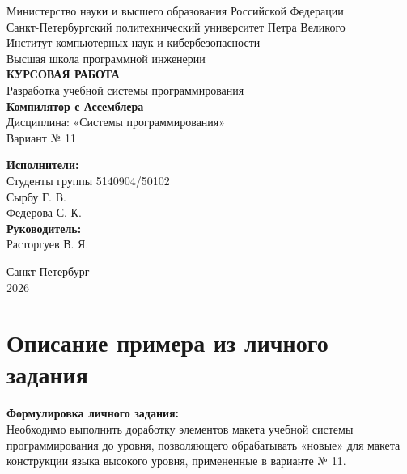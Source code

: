 \documentclass[12pt, a4paper]{article}
\begin{document}
\begin{titlepage}
    \begin{center}
        \small
        Министерство науки и высшего образования Российской Федерации\\
        Санкт-Петербургский политехнический университет Петра Великого\\
        Институт компьютерных наук и кибербезопасности\\
        Высшая школа программной инженерии\\[3cm]
        
        \Large
        \textbf{КУРСОВАЯ РАБОТА}\\[0.5cm]
        \large
        Разработка учебной системы программирования\\[0.2cm]
        \textbf{Компилятор с Ассемблера}\\[1cm]
        
        \normalsize
        Дисциплина: «Системы программирования»\\[0.5cm]
        Вариант № 11\\[3cm]
    \end{center}
    
    \begin{flushright}
        \normalsize
        \textbf{Исполнители:}\\
        Студенты группы 5140904/50102\\
        Сырбу Г. В.\\
        Федерова С. К.\\[1cm]
        
        \textbf{Руководитель:}\\
        Расторгуев В. Я.
    \end{flushright}
    
    \vfill
    
    \begin{center}
        \normalsize
        Санкт-Петербург\\
        2026
    \end{center}
\end{titlepage}

\tableofcontents
\newpage

\section{Описание примера из личного задания}

\textbf{Формулировка личного задания:}\\
Необходимо выполнить доработку элементов макета учебной системы программирования до уровня, позволяющего обрабатывать «новые» для макета конструкции языка высокого уровня, примененные в варианте № 11.
\end{document}
